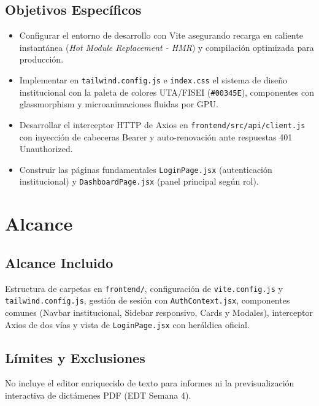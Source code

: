 \documentclass[12pt,a4paper]{article}
\begin{document}
\subsection{Objetivos Específicos}
\begin{itemize}[leftmargin=1.5em, itemsep=1.5pt, topsep=1.5pt]
    \item Configurar el entorno de desarrollo con Vite asegurando recarga en caliente instantánea (\textit{Hot Module Replacement - HMR}) y compilación optimizada para producción.
    \item Implementar en \texttt{tailwind.config.js} e \texttt{index.css} el sistema de diseño institucional con la paleta de colores UTA/FISEI (\texttt{\#00345E}), componentes con glassmorphism y microanimaciones fluidas por GPU.
    \item Desarrollar el interceptor HTTP de Axios en \texttt{frontend/src/api/client.js} con inyección de cabeceras Bearer y auto-renovación ante respuestas 401 Unauthorized.
    \item Construir las páginas fundamentales \texttt{LoginPage.jsx} (autenticación institucional) y \texttt{DashboardPage.jsx} (panel principal según rol).
\end{itemize}

\section{Alcance}

\subsection{Alcance Incluido}
Estructura de carpetas en \texttt{frontend/}, configuración de \texttt{vite.config.js} y \texttt{tailwind.config.js}, gestión de sesión con \texttt{AuthContext.jsx}, componentes comunes (Navbar institucional, Sidebar responsivo, Cards y Modales), interceptor Axios de dos vías y vista de \texttt{LoginPage.jsx} con heráldica oficial.

\subsection{Límites y Exclusiones}
No incluye el editor enriquecido de texto para informes ni la previsualización interactiva de dictámenes PDF (EDT Semana 4).

\end{document}
